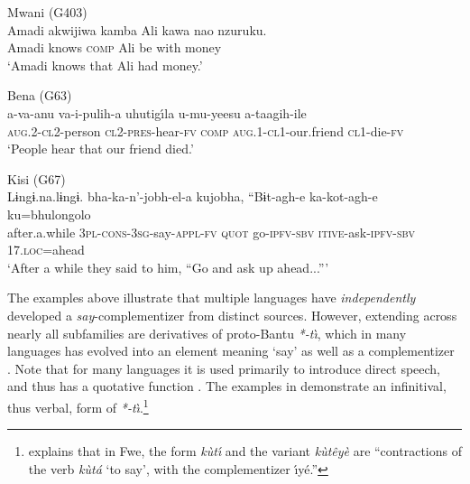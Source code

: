 \documentclass[output=paper,colorlinks,citecolor=brown,
]{langscibook}
\begin{document}
\ea
	\begin{xlist}
	\ex \label{ex:gluckman:say.kimwani} Mwani (G403) \citep[55]{LIDEMO:2010} \\
	\gll Amadi akwijiwa kamba Ali kawa nao nzuruku.\\
	Amadi knows \textsc{comp} Ali be with money\\
	\glt `Amadi knows that Ali had money.' 

\newpage
	\ex \label{ex:gluckman:say.bena} Bena (G63) \citep[417]{Morrison:2011} \\
	\gll a-va-anu va-i-pulih-a uhutig\'\i la u-mu-yeesu a-taagih-ile\\
	\textsc{aug}.2-\textsc{cl}2-person \textsc{cl}2-\textsc{pres}-hear-\textsc{fv} \textsc{comp} \textsc{aug}.1-\textsc{cl}1-our.friend \textsc{cl}1-die-\textsc{fv}\\
	\glt `People hear that our friend died.' 

	\ex \label{ex:gluckman:say.kisi} Kisi (G67) \citep[13]{Nicolleetal:2018} \\
	\gll Lɨngɨ.na.lɨngɨ. bha-ka-n'-jobh-el-a kujobha, ``Bɨt-agh-e ka-kot-agh-e ku=bhulongolo\\
	after.a.while 3\textsc{pl}-\textsc{cons}-3\textsc{sg}-say-\textsc{appl}-\textsc{fv} \textsc{quot} go-\textsc{ipfv}-\textsc{sbv} \textsc{itive}-ask-\textsc{ipfv}-\textsc{sbv} 17.\textsc{loc}=ahead\\
	\glt `After a while they said to him, ``Go and ask up ahead...''' 
	\end{xlist}
\z

The examples above illustrate that multiple languages have \textit{independently} developed a \textit{say}-complementizer from distinct sources. However, extending across nearly all subfamilies are derivatives of proto-Bantu \textit{*-t\`\i}, which in many languages has evolved into an element meaning `say' as well as a complementizer \citep{Meeussen:1967, Guldemann:2002}. Note that for many languages it is used primarily to introduce direct speech, and thus has a quotative function \citep{Guldemann:2008}. The examples in  demonstrate an infinitival, thus verbal, form of \textit{*-t\`\i}.\footnote{\citet{Gunnink:2018} explains that in Fwe, the form \textit{k\`ut\'\i} and the variant \textit{k\`ut\^ey\`e} are ``contractions of the verb \textit{k\`utá} `to say', with the complementizer {\'\i}yé.''}

\end{document}
